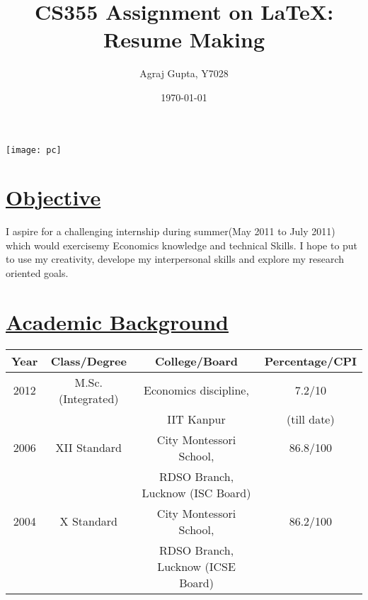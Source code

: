 \documentclass[12pt]{article}
\begin{document}
\title{CS355 Assignment on \LaTeX : Resume Making}
\author{Agraj Gupta, Y7028}
\date{\today}
\maketitle 

\newpage



\begin{minipage}[b][6.5cm][c]{7cm}
\fbox
{
\texttt{[image: pc]}}
\end{minipage}


\section*{\underline {Objective}}

I aspire for a challenging internship during summer(May 2011 to July 2011) which would exercisemy Economics knowledge and technical Skills. I hope to put to use my creativity, develope my interpersonal skills and explore my research oriented goals.



\section*{\underline {Academic Background}}
\begin{center}
	\begin{tabular}{|c|c|c|c|}\hline
		{\bf Year} & {\bf Class/Degree} & {\bf College/Board} & {\bf Percentage/CPI} \\\hline
		2012 & M.Sc.(Integrated) & Economics discipline,  & 7.2/10\\
		& & IIT Kanpur & (till date)\\\hline
		2006 & XII Standard & City Montessori School,  & 86.8/100  \\
		& & RDSO Branch, Lucknow (ISC Board)& \\\hline
		2004 & X Standard & City Montessori School,& 86.2/100  \\
		& & RDSO Branch, Lucknow (ICSE Board)  &  \\\hline
	\end{tabular}
\end{center}
\end{document}
